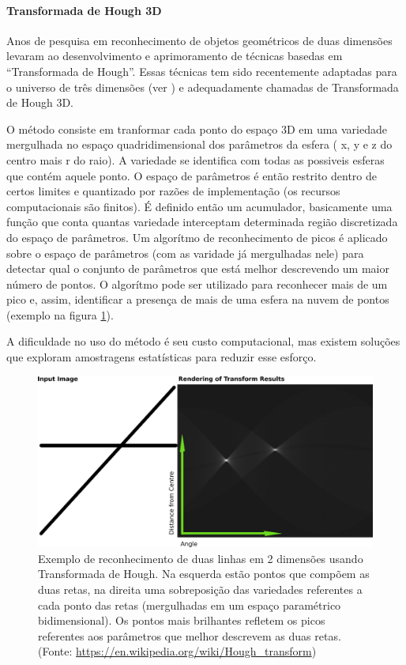  \paragraph{Transformada de Hough 3D}
Anos de pesquisa em reconhecimento de objetos geométricos de duas dimensões
levaram ao desenvolvimento e aprimoramento de técnicas basedas em ``Transformada
de Hough''. Essas técnicas tem sido recentemente adaptadas para o universo de
três dimensões (ver \cite{hough2014}) e adequadamente chamadas de Transformada
de Hough 3D.

O método consiste em tranformar cada ponto do espaço 3D em uma variedade
mergulhada no espaço quadridimensional dos parâmetros da esfera ( x, y e z do
centro mais r do raio). A variedade se identifica com todas as possiveis esferas
que contém aquele ponto. O espaço de parâmetros é então restrito dentro de
certos limites e quantizado por razões de implementação (os recursos
computacionais são finitos). É definido então um acumulador, basicamente uma
função que conta quantas variedade interceptam determinada região discretizada
do espaço de parâmetros. Um algorítmo de reconhecimento de picos é aplicado
sobre o espaço de parâmetros (com as varidade já mergulhadas nele) para detectar
qual o conjunto de parâmetros que está melhor descrevendo um maior número de
pontos. O algorítmo pode ser utilizado para reconhecer mais de um pico e, assim,
identificar a presença de mais de uma esfera na nuvem de pontos (exemplo na
figura \ref{fig::hough}).

A dificuldade no uso do método é seu custo computacional, mas existem soluções
que exploram amostragens estatísticas para reduzir esse esforço.

\begin{figure}[h!]
   \centering
   \includegraphics[width=0.95\columnwidth]{figs/calibracao/hough}
   \caption{Exemplo de reconhecimento de duas linhas em 2 dimensões usando
   Transformada de Hough. Na esquerda estão pontos que compõem as duas retas, na
   direita uma sobreposição das variedades referentes a cada ponto das retas
   (mergulhadas em um espaço paramétrico bidimensional). Os pontos mais
   brilhantes refletem os picos referentes aos parâmetros que melhor descrevem as duas retas. (Fonte: 
   \url{https://en.wikipedia.org/wiki/Hough_transform})}
   \label{fig::hough}
\end{figure}


